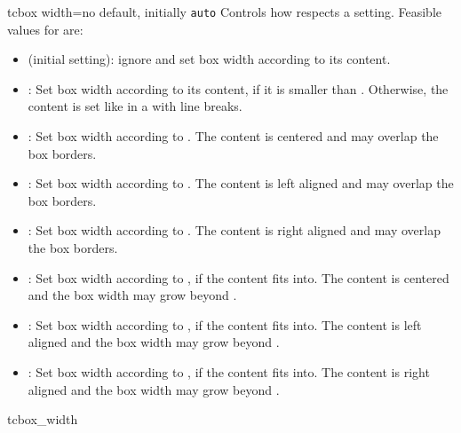 \clearpage
\begin{docTcbKey}[][doc new=2015-03-23]{tcbox width}{=}{no default, initially \texttt{auto}}
Controls how  respects a  setting.
Feasible values for  are:
\begin{itemize}
\item{} (initial setting):
  ignore  and set box width according to its content.
\item{}:
  Set box width according to its content, if it is smaller than .
  Otherwise, the content is set like in a  with line breaks.
\item{}:
  Set box width according to .
  The content is centered and may overlap the box borders.
\item{}:
  Set box width according to .
  The content is left aligned and may overlap the box borders.
\item{}:
  Set box width according to .
  The content is right aligned and may overlap the box borders.
\item{}:
  Set box width according to , if the content fits into.
  The content is centered and the box width may grow beyond .
\item{}:
  Set box width according to , if the content fits into.
  The content is left aligned and the box width may grow beyond .
\item{}:
  Set box width according to , if the content fits into.
  The content is right aligned and the box width may grow beyond .
\end{itemize}

\enlargethispage*{1cm}

\begin{exdispExample}{tcbox_width}


\end{exdispExample}
\end{docTcbKey}
